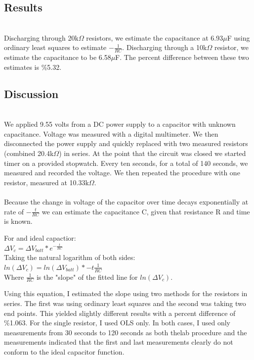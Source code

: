 \documentclass{article}
\begin{document}
\begin{samepage}
\section{Results}\hfill\\
Discharging through 20k$\Omega$ resistors, we estimate the capacitance at 6.93$\mu$F using ordinary least squares to estimate $-\frac{1}{RC}$.  Discharging through a 10k$\Omega$ resistor, we estimate the capacitance to be 6.58$\mu$F.  The percent difference between these two estimates is \%5.32.  
\end{samepage}
\begin{samepage}
\section{Discussion}\hfill\\
\nopagebreak
We applied 9.55 volts from a DC power supply to a capacitor with unknown capacitance.  Voltage was measured with a digital multimeter.  We then disconnected the power supply and quickly replaced with two measured resistors (combined 20.4k$\Omega$) in series.  At the point that the circuit was closed we started timer on a provided stopwatch.  Every ten seconds, for a total of 140 seconds, we measured and recorded the voltage.  We then repeated the procedure with one resistor, measured at 10.33k$\Omega$.  \\ \\
Because the change in voltage of the capacitor over time decays exponentially at rate of $-\frac{t}{RC}$ we can estimate the capacitance C, given that resistance R and time is known. \\
\begin{center}
For and ideal capactior: \\
$\Delta V_c = \Delta V_{batt} * e^{-\frac{t}{RC}}$\\
Taking the natural logarithm of both sides:\\
$ln(\Delta V_c )= ln(\Delta V_{batt} )* -t{\frac{1}{RC}}$ \\ 
Where ${\frac{1}{RC}}$ is the "slope" of the fitted line for $ln(\Delta V_c )$. \\
\end{center}
Using this equation, I estimated the slope using two methods for the resistors in series.  The first was using ordinary least squares and the second was taking two end points.  This yielded slightly different results with a percent difference of \%1.063.  For the single resistor, I used OLS only.  In both cases, I used only measurements from 30 seconds to 120 seconds as both thelab  procedure and the measurements indicated that the first and last measurements clearly do not conform to the ideal capacitor function.\\ \\

\end{samepage}
\end{document}

